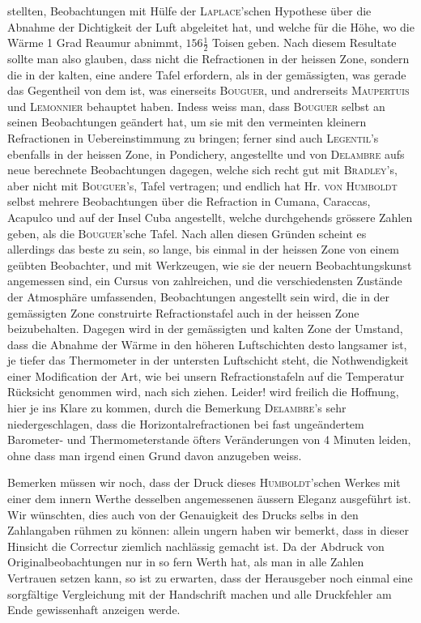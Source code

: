 \noindent stellten, Beobachtungen mit Hülfe der \textsc{Laplace}'schen Hypothese über die Abnahme der Dichtigkeit der Luft abgeleitet hat, und welche für die Höhe, wo die Wärme 1 Grad Reaumur abnimmt, $156\frac{1}{2}$ Toisen geben. Nach diesem Resultate sollte man also glauben, dass nicht die Refractionen in der heissen Zone, sondern die in der kalten, eine andere Tafel erfordern, als in der gemässigten, was gerade das Gegentheil von dem ist, was einerseits \textsc{Bouguer}, und andrerseits \textsc{Maupertuis} und \textsc{Lemonnier} behauptet haben. Indess weiss man, dass \textsc{Bouguer} selbst an seinen Beobachtungen geändert hat, um sie mit den vermeinten kleinern Refractionen in Uebereinstimmung zu bringen; ferner sind auch \textsc{Legentil}'s ebenfalls in der heissen Zone, in Pondichery, angestellte und von \textsc{Delambre} aufs neue berechnete Beobachtungen dagegen, welche sich recht gut mit \textsc{Bradley}'s, aber nicht mit \textsc{Bouguer}'s, Tafel vertragen; und endlich hat Hr. \textsc{von Humboldt} selbst mehrere Beobachtungen über die Refraction in Cumana, Caraccas, Acapulco und auf der Insel Cuba angestellt, welche durchgehends grössere Zahlen geben, als die \textsc{Bouguer}'sche Tafel. Nach allen diesen Gründen scheint es allerdings das beste zu sein, so lange, bis einmal in der heissen Zone von einem geübten Beobachter, und mit Werkzeugen, wie sie der neuern Beobachtungskunst angemessen sind, ein Cursus von zahlreichen, und die verschiedensten Zustände der Atmosphäre umfassenden, Beobachtungen angestellt sein wird, die in der gemässigten Zone construirte Refractionstafel auch in der heissen Zone beizubehalten. Dagegen wird in der gemässigten und kalten Zone der Umstand, dass die Abnahme der Wärme in den höheren Luftschichten desto langsamer ist, je tiefer das Thermometer in der untersten Luftschicht steht, die Nothwendigkeit einer Modification der Art, wie bei unsern Refractionstafeln auf die Temperatur Rücksicht genommen wird, nach sich ziehen. Leider! wird freilich die Hoffnung, hier je ins Klare zu kommen, durch die Bemerkung \textsc{Delambre}'s sehr niedergeschlagen, dass die Horizontalrefractionen bei fast ungeändertem Barometer- und Thermometerstande öfters Veränderungen von 4 Minuten leiden, ohne dass man irgend einen Grund davon anzugeben weiss.

Bemerken müssen wir noch, dass der Druck dieses \textsc{Humboldt}'schen Werkes mit einer dem innern Werthe desselben angemessenen äussern Eleganz ausgeführt ist. Wir wünschten, dies auch von der Genauigkeit des Drucks selbs in den Zahlangaben rühmen zu können: allein ungern haben wir bemerkt, dass in dieser Hinsicht die Correctur ziemlich nachlässig gemacht ist. Da der Abdruck von Originalbeobachtungen nur in so fern Werth hat, als man in alle Zahlen Vertrauen setzen kann, so ist zu erwarten, dass der Herausgeber noch einmal eine sorgfältige Vergleichung mit der Handschrift machen und alle Druckfehler am Ende gewissenhaft anzeigen werde.
